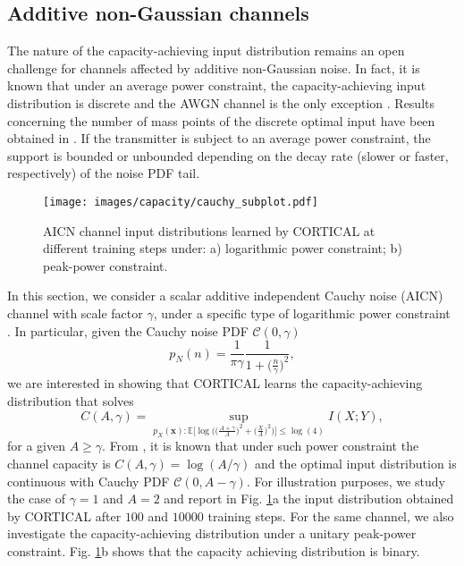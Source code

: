 \subsection{Additive non-Gaussian channels}
The nature of the capacity-achieving input distribution remains an open challenge for channels affected by additive non-Gaussian noise. In fact, it is known that under an average power constraint, the capacity-achieving input distribution is discrete and the AWGN channel is the only exception \cite{Fahs2012}. Results concerning the number of mass points of the discrete optimal input have been obtained in \cite{Tchamkerten2004,Das2000}. If the transmitter is subject to an average power constraint, the support is bounded or unbounded depending on the decay rate (slower or faster, respectively) of the noise PDF tail.

\begin{figure}
	\centering
	\texttt{[image: images/capacity/cauchy\_subplot.pdf]}
	\caption{AICN channel input distributions learned by CORTICAL at different training steps under: a) logarithmic power constraint; b) peak-power constraint.}
	\label{fig:CORTICAL_cauchy_subplot}
\end{figure} 
In this section, we consider a scalar additive independent Cauchy noise (AICN) channel with scale factor $\gamma$, under a specific type of logarithmic power constraint \cite{Fahs2014}. In particular, given the Cauchy noise PDF $\mathcal{C}(0,\gamma)$
\begin{equation}
    p_N(n) = \frac{1}{\pi \gamma}\frac{1}{1+\bigl(\frac{n}{\gamma}\bigr)^2},
\end{equation}
we are interested in showing that CORTICAL learns the capacity-achieving distribution that solves
\begin{equation}
C(A,\gamma) = \sup_{p_X(\mathbf{x}): \mathbb{E}\bigl[\log\bigl(\bigl(\frac{A+\gamma}{A}\bigr)^2+\bigl(\frac{X}{A}\bigr)^2\bigr)\bigr]\leq \log(4)} I(X;Y),
\end{equation}
for a given $A\geq \gamma$. From \cite{Fahs2014}, it is known that under such power constraint the channel capacity is $C(A,\gamma)=\log(A/\gamma)$ and the optimal input distribution is continuous with Cauchy PDF $\mathcal{C}(0,A-\gamma)$. For illustration purposes, we study the case of $\gamma=1$ and $A=2$ and report in Fig. \ref{fig:CORTICAL_cauchy_subplot}a the input distribution obtained by CORTICAL after $100$ and $10000$ training steps. For the same channel, we also investigate the capacity-achieving distribution under a unitary peak-power constraint. Fig. \ref{fig:CORTICAL_cauchy_subplot}b shows that the capacity achieving distribution is binary.

